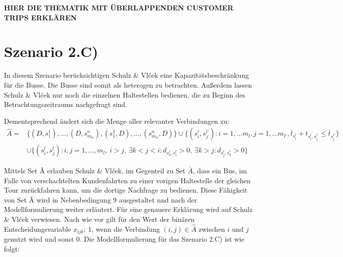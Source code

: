 \textbf{HIER DIE THEMATIK MIT ÜBERLAPPENDEN CUSTOMER TRIPS ERKLÄREN}

\section{Szenario 2.C)}
\label{sec:4.4}
\label{sec:Szenario 2.C)}
In diesem Szenario berücksichtigen Schulz \& Vlćek eine Kapazitätsbeschränkung für die Busse. Die Busse sind somit als heterogen zu betrachten. Außerdem lassen Schulz \& Vlćek nur noch die einzelnen Haltestellen bedienen, die zu Beginn des Betrachtungszeitraums nachgefragt sind.

Dementsprechend ändert sich die Menge aller relevanter Verbindungen zu:
\begin{align*}
    \hat{A} =
    & \big\{(D, s_1^1), \dots, (D, s_{m_n}^n), (s_1^1, D), \dots, (s_{m_n}^n, D)\big\} \cup \big\{(s_i^l, s_j^{l'}) :i = 1, \dots m_l,j = 1, \dots m_{l'}, \bar{t}_{s_i^l} + t_{s_i^l, s_j^{l'}} \leq \bar{t}_{s_j^{l'}} \big\} \\
    & \cup \big\{ (s_i^l, s_j^l) : i,j = 1,\dots, m_l,\ i > j,\ 
    \exists k < j < i : d_{s_k^l, s_i^l} > 0,\ 
    \exists k > j : d_{s_j^l, s_k^l} > 0 \big\}
\end{align*}
    
Mittels Set Â erlauben Schulz \& Vlćek, im Gegenteil zu Set $\bar{A}$, dass ein Bus, im Falle von verschachtelten Kundenfahrten zu einer vorigen Haltestelle der gleichen Tour \glqq zurückfahren\grqq{} kann, um die dortige Nachfrage zu bedienen. Diese Fähigkeit von Set Â wird in Nebenbedingung 9 ausgestaltet und nach der Modellformulierung weiter erläutert. Für eine genauere Erklärung wird auf Schulz \& Vlćek verwiesen. Nach wie vor gilt für den Wert der binären Entscheidungsvariable $x_{ijk}$: 1, wenn die Verbindung $(i,j) \in \hat{A}$ zwischen $i$ und $j$  genutzt wird und sonst 0. Die Modellformulierung für das Szenario 2.C) ist wie folgt:
 
